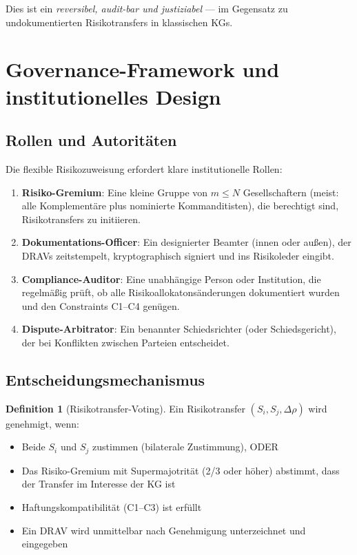 \documentclass[a4paper,12pt]{article}
\theoremstyle{definition}
\newtheorem{definition}{Definition}
\begin{document}
Dies ist ein \emph{reversibel, audit-bar und justiziabel} --- im Gegensatz zu undokumentierten Risikotransfers in klassischen KGs.

\section{Governance-Framework und institutionelles Design}

\subsection{Rollen und Autoritäten}

Die flexible Risikozuweisung erfordert klare institutionelle Rollen:

\begin{enumerate}
    \item \textbf{Risiko-Gremium}: Eine kleine Gruppe von $m \leq N$ Gesellschaftern (meist: alle Komplementäre plus nominierte Kommanditisten), die berechtigt sind, Risikotransfers zu initiieren.
    
    \item \textbf{Dokumentations-Officer}: Ein designierter Beamter (innen oder außen), der DRAVs zeitstempelt, kryptographisch signiert und ins Risikoleder eingibt.
    
    \item \textbf{Compliance-Auditor}: Eine unabhängige Person oder Institution, die regelmäßig prüft, ob alle Risikoallokatonsänderungen dokumentiert wurden und den Constraints C1--C4 genügen.
    
    \item \textbf{Dispute-Arbitrator}: Ein benannter Schiedsrichter (oder Schiedsgericht), der bei Konflikten zwischen Parteien entscheidet.
\end{enumerate}

\subsection{Entscheidungsmechanismus}

\begin{definition}[Risikotransfer-Voting]
Ein Risikotransfer $(S_i, S_j, \Delta\rho)$ wird genehmigt, wenn:
\begin{itemize}
    \item Beide $S_i$ und $S_j$ zustimmen (bilaterale Zustimmung), ODER
    \item Das Risiko-Gremium mit Supermajotrität (2/3 oder höher) abstimmt, dass der Transfer im Interesse der KG ist
    \item Haftungskompatibilität (C1--C3) ist erfüllt
    \item Ein DRAV wird unmittelbar nach Genehmigung unterzeichnet und eingegeben
\end{itemize}
\end{definition}
\end{document}
